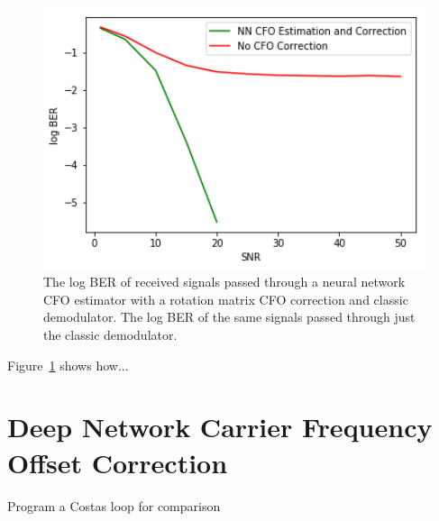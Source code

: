 \begin{figure}
\begin{center}
\includegraphics[width=14cm]{figures/cfo_estimation.png}
\caption{The log BER of received signals passed through a neural network CFO estimator with a rotation matrix CFO correction and classic demodulator. The log BER of the same signals passed through just the classic demodulator.}
\label{fig:cfo_est}
\end{center}
\end{figure}

Figure~\ref{fig:cfo_est} shows how...

\section{Deep Network Carrier Frequency Offset Correction}
Program a Costas loop for comparison 